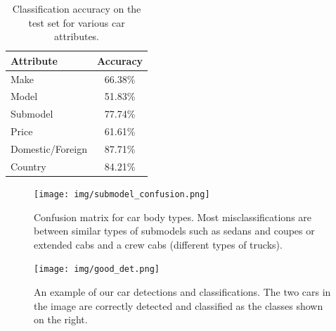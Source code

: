 \documentclass[10pt,twocolumn,letterpaper]{article}
\begin{document}
\begin{table}
\begin{center}
\begin{tabular}{|l|c|}
\hline
\textbf{Attribute} & \textbf{Accuracy} \\
\hline\hline
Make & 66.38\%\\
Model & 51.83\% \\
Submodel & 77.74\% \\
Price & 61.61\% \\
Domestic/Foreign & 87.71\%\\
Country & 84.21\%\\
\hline
\end{tabular}
\end{center}
\caption{Classification accuracy on the test set for various car attributes.}
\label{table:att-acc}
\end{table}

\begin{figure}[t]
\begin{center}
   \texttt{[image: img/submodel\_confusion.png]}
\end{center}
   \caption{Confusion matrix for car body types. Most misclassifications are between similar types of submodels such as sedans and coupes or extended cabs and a crew cabs (different types of trucks).} 
\label{fig:confusion}
\end{figure}

\begin{figure} [t]
\begin{center}
\texttt{[image: img/good\_det.png]}
\end{center}
\caption {An example of our car detections and classifications. The two cars in the image are correctly detected and classified as the classes shown on the right.}
\label{fig:dets}
\end{figure}
\end{document}
